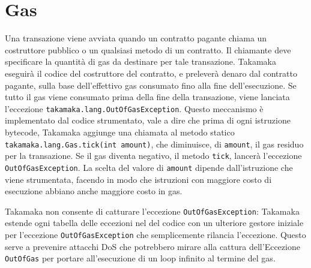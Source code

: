 \section{Gas} \label{takamaka:gas}
Una transazione viene avviata quando un contratto pagante chiama un costruttore pubblico o un qualsiasi metodo di un contratto. Il chiamante deve specificare la quantità di gas da destinare per tale transazione. Takamaka eseguirà il codice del costruttore del contratto, e preleverà denaro dal contratto pagante, sulla base dell'effettivo gas consumato fino alla fine dell'esecuzione. Se tutto il gas viene consumato prima della fine della transazione, viene lanciata l'eccezione \lstinline|takamaka.lang.OutOfGasException|. Questo meccanismo è implementato dal codice strumentato, vale a dire che prima di ogni istruzione bytecode, Takamaka aggiunge una chiamata al metodo statico \lstinline|takamaka.lang.Gas.tick(int amount)|, che diminuisce, di \lstinline|amount|, il gas residuo per la transazione. Se il gas diventa negativo, il metodo \lstinline|tick|, lancerà l'eccezione \lstinline|OutOfGasException|. La scelta del valore di \lstinline|amount| dipende dall'istruzione che viene strumentata, facendo in modo che istruzioni con maggiore costo di esecuzione abbiano anche maggiore costo in gas.

Takamaka non consente di catturare l'eccezione \lstinline|OutOfGasException|: Takamaka estende ogni tabella delle eccezioni nel del codice con un ulteriore gestore iniziale per l'eccezione \lstinline|OutOfGasException| che semplicemente rilancia l'eccezione. Questo serve a prevenire attacchi DoS che potrebbero mirare alla cattura dell'Eccezione \lstinline|OutOfGas| per portare all'esecuzione di un loop infinito al termine del gas.

